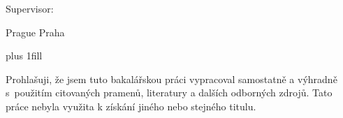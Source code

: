 \begin{center}
\vspace{10mm}

{\Large\ThesisTitle}

\vspace{3mm}

{\Large\CZThesisTitle}

\vfill

{\ThesisTypeName}

\vspace{10mm}

{Supervisor: \Supervisor}

\vspace{10mm}

%



\ifEN Prague \else Praha \fi
\YearSubmitted

\vfill

\end{center}

\newpage

\openright
\hypersetup{pageanchor=true}
\pagestyle{plain}
\vglue 0pt plus 1fill

\noindent
Prohlašuji, že jsem tuto bakalářskou práci vypracoval samostatně a výhradně
s~použitím citovaných pramenů, literatury a dalších odborných zdrojů.
Tato práce nebyla využita k získání jiného nebo stejného titulu.
%

